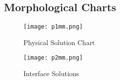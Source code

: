 \subsection{Morphological Charts}

\begin{figure}
    \centering
    \texttt{[image: p1mm.png]}
    \caption{Physical Solution Chart}
    \label{fig:enter-label}
\end{figure}

\begin{figure}
    \centering
    \texttt{[image: p2mm.png]}
    \caption{Interface Solutions}
    \label{fig:enter-label}
\end{figure}


